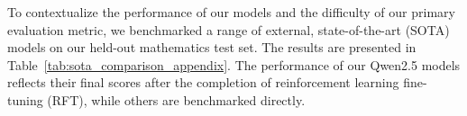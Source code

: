 To contextualize the performance of our models and the difficulty of our primary evaluation metric, we benchmarked a range of external, state-of-the-art (SOTA) models on our held-out mathematics test set. The results are presented in Table~\ref{tab:sota_comparison_appendix}. The performance of our Qwen2.5 models reflects their final scores after the completion of reinforcement learning fine-tuning (RFT), while others are benchmarked directly.



 



 


 


 



 


 

 






